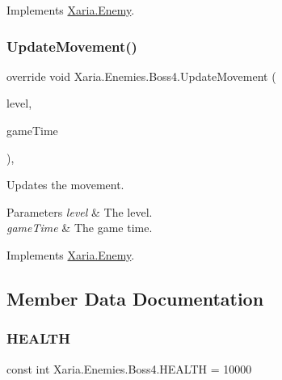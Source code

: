 Implements \hyperlink{classXaria_1_1Enemy_a229b595e96e1429a9e9b1d9816d4370b}{Xaria.\+Enemy}.

\mbox{\label{classXaria_1_1Enemies_1_1Boss4_a7962281c412a9192916819e463d625d2}} 
\subsubsection{\texorpdfstring{Update\+Movement()}{UpdateMovement()}}
{\footnotesize\ttfamily override void Xaria.\+Enemies.\+Boss4.\+Update\+Movement (\begin{DoxyParamCaption}\item[{\hyperlink{classXaria_1_1Level}{Level}}]{level,  }\item[{Game\+Time}]{game\+Time }\end{DoxyParamCaption})\hspace{0.3cm}{\ttfamily [inline]}, {\ttfamily [virtual]}}



Updates the movement. 


\begin{DoxyParams}{Parameters}
{\em level} & The level.\\
\hline
{\em game\+Time} & The game time.\\
\hline
\end{DoxyParams}


Implements \hyperlink{classXaria_1_1Enemy_abe1058263c5512b5e098e73d3b6d704c}{Xaria.\+Enemy}.



\subsection{Member Data Documentation}
\mbox{\label{classXaria_1_1Enemies_1_1Boss4_a68cfc0ca9bc301b4085c8b9de57de5f3}} 
\subsubsection{\texorpdfstring{H\+E\+A\+L\+TH}{HEALTH}}
{\footnotesize\ttfamily const int Xaria.\+Enemies.\+Boss4.\+H\+E\+A\+L\+TH = 10000\hspace{0.3cm}{\ttfamily [private]}}




